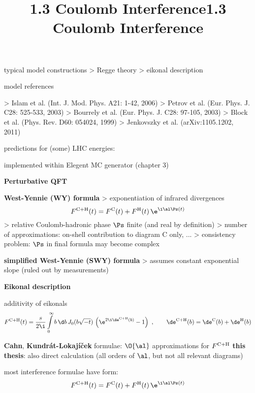 \> typical model constructions
\>> Regge theory
\>> eikonal description

\> model references

\>> Islam et al. (Int. J. Mod. Phys. A21: 1-42, 2006)
\>> Petrov et al. (Eur. Phys. J. C28: 525-533, 2003)
\>> Bourrely et al. (Eur. Phys. J. C28: 97-105, 2003)
\>> Block et al. (Phys. Rev. D60: 054024, 1999)
\>> Jenkovszky et al. (arXiv:1105.1202, 2011)

\> predictions for (some) LHC energies:

\centerline{}

\> implemented within Elegent MC generator (chapter 3)


\newpage%
\title{1.3 Coulomb Interference}



\centerline{\cmyk{\TitColor}\bf Perturbative QFT\cmyk{\FgColor}}

\centerline{}

\> {\bf West-Yennie (WY) formula}
\>> exponentiation of infrared divergences
$$F^{\rm C+H}(t) = F^{\rm C}(t) + F^{\rm H}(t) \, \e^{\i \al \Ps(t)}$$
\>> relative Coulomb-hadronic phase $\Ps$ finite (and real by definition)
\>> number of approximations: on-shell contribution to diagram C only, ...
\>> consistency problem: $\Ps$ in final formula may become complex

\> {\bf simplified West-Yennie (SWY) formula}
\>> assumes constant exponential slope (ruled out by measurements)

\vfil
\centerline{\cmyk{\TitColor}\bf Eikonal description\cmyk{\FgColor}}

\> additivity of eikonals
$$
	F^{\rm C+H}(t) = {s\over 2\i}\int\limits_0^\infty b\,\d b\,J_0(b\sqrt{-t})\,\left( \e^{2\i\de^{\rm C+H}(b)} - 1 \right)
	\ ,\qquad
	\de^{\rm C+H}(b) = \de^{\rm C}(b) + \de^{\rm H}(b)
$$

\> {\bf Cahn}, {\bf Kundrát-Lokajíček} formulae: $\O{\al}$ approximations for $F^{\rm C+H}$
\> {\bf this thesis}: also direct calculation (all orders of $\al$, but not all relevant diagrams)

\newpage%
\title{1.3 Coulomb Interference}

\> most interference formulae have form:
$$F^{\rm C+H}(t) = F^{\rm C}(t) + F^{\rm H}(t) \, \e^{\i \al \Ps(t)}$$

